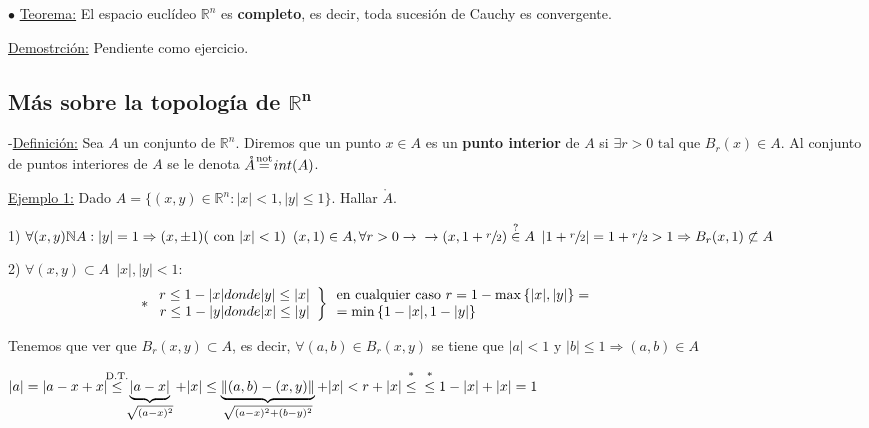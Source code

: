 \documentclass[12pt, titlepage]{article}
\newcommand{\eqc}[1]{\stackrel{\mathclap{\normalfont\mbox{\scriptsize{#1}}}}{=}}
\newcommand{\leqc}[1]{\stackrel{\mathclap{\normalfont\mbox{\scriptsize{#1}}}}{\leq}}
\newcommand{\inc}[1]{\stackrel{\mathclap{\normalfont\mbox{\scriptsize{#1}}}}{\in}}
\newcommand{\R}{\mathbb{R}}
\newcommand{\N}{\mathbb{N}}
\newcommand{\spac}{\, \, \,}
\begin{document}
\noindent $\bullet$ \underline{Teorema:} El espacio euclídeo $\R^n$ es \textbf{completo}, es decir, toda sucesión de Cauchy es convergente.
\vspace{2mm}

\underline{Demostrción:} Pendiente como ejercicio.
\vspace{5mm}

\subsection{Más sobre la topología de $\mathbf{\R^n}$}
\vspace{5mm}


-\underline{Definición:} Sea $A$ un conjunto de $\R^n$. Diremos que un punto $x \in A$  es un \textbf{punto interior} de $A$ si $\exists r > 0 \text{ tal que } B_r (x) \in A$. Al conjunto de puntos interiores de $A$ se le denota $\mathring{A} \eqc{not} int(A)$.
\vspace{3mm}

\underline{Ejemplo 1:} Dado $A = \{(x, y) \in \R^n : |x|<1, |y| \leq 1 \}$. Hallar $\mathring{A}$.
\vspace{3mm}

1) $\forall (x, y) \N A : |y| = 1 \Rightarrow (x, \pm 1) (\text{ con } |x| < 1) \spac (x, 1) \in A, \forall r > 0 \rightarrow \\ \rightarrow (x, 1 + \sfrac{r}{2}) \inc{?} A \spac |1 + \sfrac{r}{2}| = 1 + \sfrac{r}{2} > 1 \Rightarrow B_r(x, 1) \not \subset A$

2) $\forall (x, y) \subset A \spac |x|, |y| < 1$:
\[
*\left. \begin{array}{rc}

r \leq 1- |x| donde |y| \leq |x|\\
r \leq 1- |y| donde |x| \leq |y|

\end{array}\right \}\spac\parbox{10cm}{en cualquier caso $r = 1 - \max{\{|x|, |y|\}} = \\ =\min{\{1 - |x|, 1 - |y|\}}$}
\]

Tenemos que ver que $B_r (x, y) \subset A$, es decir, $\forall (a, b) \in B_r(x, y)$ se tiene que $|a| < 1 \text{ y } |b| \leq 1 \Rightarrow (a, b) \in A$

$|a| = |a - x + x| \leqc{D.T.} \underbrace{|a-x|}_{\sqrt{(a - x)^2}} + |x| \leq \underbrace{\|(a, b) - (x, y)\|}_{\sqrt{(a -x)^2 + (b - y)^2}} + |x| < r + |x| \leqc{*} \\ \leqc{*} 1 - |x| +|x| =1$
\vspace{3mm}
\end{document}
